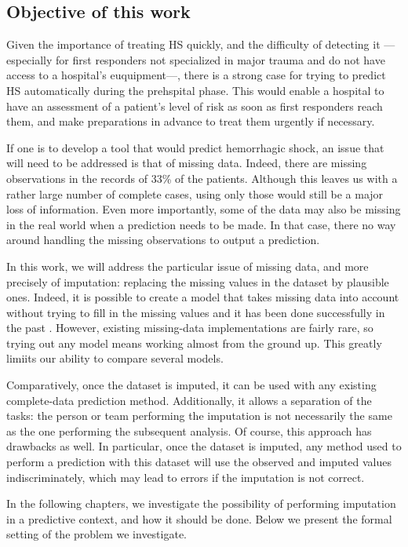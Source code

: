 		\subsection{Objective of this work}
Given the importance of treating HS quickly, and the difficulty of detecting it --- especially for first responders not specialized in major trauma and do not have access to a hospital's euquipment---, there is a strong case for trying to predict HS automatically during the prehspital phase. This would enable a hospital to have an assessment of a patient's level of risk as soon as first responders reach them, and make preparations in advance to treat them urgently if necessary.
		
If one is to develop a tool that would predict hemorrhagic shock, an issue that will need to be addressed is that of missing data. Indeed, there are missing observations in the records of 33\% of the patients. Although this leaves us with a rather large number of complete cases, using only those would still be a major loss of information. Even more importantly, some of the data may also be missing in the real world when a prediction needs to be made. In that case, there no way around handling the missing observations to output a prediction.

In this work, we will address the particular issue of missing data, and more precisely of imputation: replacing the missing values in the dataset by plausible ones. Indeed, it is possible to create a model that takes missing data into account without trying to fill in the missing values and it has been done successfully in the past \cite{miss_model1}\cite{miss_model2}. However, existing missing-data implementations are fairly rare, so trying out any model means working almost from the ground up. This greatly limiits our ability to compare several models.

Comparatively, once the dataset is imputed, it can be used with any existing complete-data prediction method. Additionally, it allows a separation of the tasks: the person or team performing the imputation is not necessarily the same as the one performing the subsequent analysis. Of course, this approach has drawbacks as well. In particular, once the dataset is imputed, any method used to perform a prediction with this dataset will use the observed and imputed values indiscriminately, which may lead to errors if the imputation is not correct.

 In the following chapters, we investigate the possibility of performing imputation in a predictive context, and how it should be done. Below we present the formal setting of the problem we investigate.
